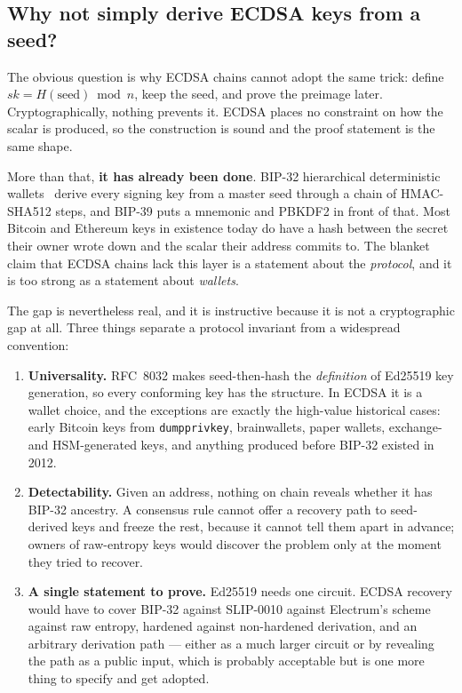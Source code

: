 \subsection{Why not simply derive ECDSA keys from a seed?}
\label{sec:why-not-ecdsa-seed}

The obvious question is why ECDSA chains cannot adopt the same trick: define
$sk = H(\text{seed}) \bmod n$, keep the seed, and prove the preimage later.
Cryptographically, nothing prevents it. ECDSA places no constraint on how the
scalar is produced, so the construction is sound and the proof statement is the
same shape.

More than that, \textbf{it has already been done}. BIP-32 hierarchical
deterministic wallets~\cite{bip32} derive every signing key from a master seed
through a chain of HMAC-SHA512 steps, and BIP-39 puts a mnemonic and PBKDF2 in
front of that. Most Bitcoin and Ethereum keys in existence today do have a hash
between the secret their owner wrote down and the scalar their address commits
to. The blanket claim that ECDSA chains lack this layer is a statement about the
\emph{protocol}, and it is too strong as a statement about \emph{wallets}.

The gap is nevertheless real, and it is instructive because it is not a
cryptographic gap at all. Three things separate a protocol invariant from a
widespread convention:

\begin{enumerate}
  \item \textbf{Universality.} RFC~8032 makes seed-then-hash the \emph{definition}
        of Ed25519 key generation, so every conforming key has the structure. In
        ECDSA it is a wallet choice, and the exceptions are exactly the
        high-value historical cases: early Bitcoin keys from \texttt{dumpprivkey},
        brainwallets, paper wallets, exchange- and HSM-generated keys, and
        anything produced before BIP-32 existed in 2012.
  \item \textbf{Detectability.} Given an address, nothing on chain reveals
        whether it has BIP-32 ancestry. A consensus rule cannot offer a recovery
        path to seed-derived keys and freeze the rest, because it cannot tell them
        apart in advance; owners of raw-entropy keys would discover the problem
        only at the moment they tried to recover.
  \item \textbf{A single statement to prove.} Ed25519 needs one circuit. ECDSA
        recovery would have to cover BIP-32 against SLIP-0010 against Electrum's
        scheme against raw entropy, hardened against non-hardened derivation, and
        an arbitrary derivation path --- either as a much larger circuit or by
        revealing the path as a public input, which is probably acceptable but is
        one more thing to specify and get adopted.
\end{enumerate}

